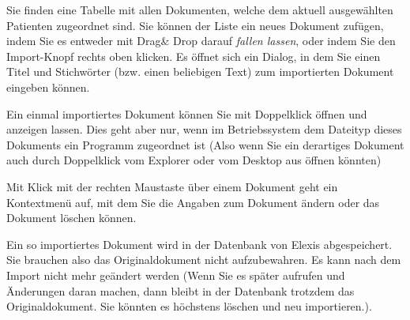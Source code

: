 Sie finden eine Tabelle mit allen Dokumenten, welche dem aktuell ausgewählten Patienten zugeordnet sind.
Sie können der Liste ein neues Dokument zufügen, indem Sie es entweder mit Drag\& Drop darauf \textit{fallen lassen}, oder indem Sie den Import-Knopf rechts oben klicken.
Es öffnet sich ein Dialog, in dem Sie einen Titel und Stichwörter (bzw. einen beliebigen Text) zum importierten  Dokument eingeben können.

Ein einmal importiertes Dokument können Sie mit Doppelklick öffnen und anzeigen lassen.  Dies geht aber nur, wenn im Betriebssystem dem Dateityp dieses Dokuments ein Programm zugeordnet ist (Also wenn Sie ein derartiges Dokument auch durch Doppelklick vom Explorer oder vom Desktop aus öffnen könnten)

Mit Klick mit der rechten Maustaste über einem Dokument geht ein Kontextmenü auf, mit dem Sie die Angaben zum Dokument ändern oder das Dokument löschen können.

Ein so importiertes Dokument wird in der Datenbank von Elexis abgespeichert. Sie brauchen also das Originaldokument nicht aufzubewahren. Es kann nach dem Import nicht mehr geändert werden (Wenn Sie es später aufrufen und Änderungen daran machen, dann bleibt in der Datenbank trotzdem das Originaldokument. Sie könnten es höchstens löschen und neu importieren.).



